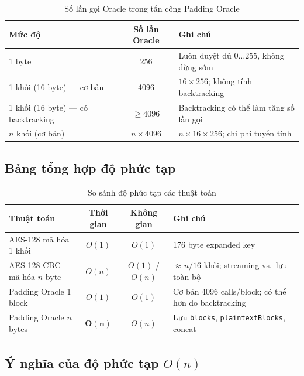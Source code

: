 \begin{table}[htbp]
\centering
\caption{Số lần gọi Oracle trong tấn công Padding Oracle}
\label{tab:oracle-calls}
\begin{tabular}{@{}p{5cm}cp{5.5cm}@{}}
\toprule
\textbf{Mức độ} & \textbf{Số lần Oracle} & \textbf{Ghi chú} \\
\midrule
1 byte                              & 256          & Luôn duyệt đủ $0\ldots255$, không dừng sớm \\
1 khối (16 byte) --- cơ bản         & 4096         & $16 \times 256$; không tính backtracking \\
1 khối (16 byte) --- có backtracking & $\ge 4096$  & Backtracking có thể làm tăng số lần gọi \\
$n$ khối (cơ bản)                   & $n \times 4096$ & $n \times 16 \times 256$; chi phí tuyến tính \\
\bottomrule
\end{tabular}
\end{table}

\subsection{Bảng tổng hợp độ phức tạp}

\begin{table}[htbp]
\centering
\caption{So sánh độ phức tạp các thuật toán}
\label{tab:cplx-summary}
\begin{tabular}{@{}p{4.5cm}ccp{4.5cm}@{}}
\toprule
\textbf{Thuật toán} & \textbf{Thời gian} & \textbf{Không gian} & \textbf{Ghi chú} \\
\midrule
AES-128 mã hóa 1 khối                     & $O(1)$ & $O(1)$ & 176 byte expanded key \\
AES-128-CBC mã hóa $n$ byte              & $O(n)$ & $O(1)$ / $O(n)$ & $\approx n/16$ khối; streaming vs.\ lưu toàn bộ \\
Padding Oracle 1 block                    & $O(1)$ & $O(1)$ & Cơ bản 4096 calls/block; có thể hơn do backtracking \\
Padding Oracle $n$ bytes                  & $\mathbf{O(n)}$ & $O(n)$ & Lưu \texttt{blocks}, \texttt{plaintextBlocks}, concat \\
\bottomrule
\end{tabular}
\end{table}

\subsection{Ý nghĩa của độ phức tạp $O(n)$}

